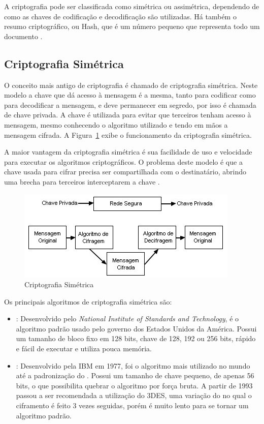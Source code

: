 A criptografia pode ser classificada como simétrica ou assimétrica, dependendo de como as chaves de codificação e decodificação são utilizadas. Há também o resumo criptográfico, ou Hash, que é um número pequeno que representa todo um documento \cite{Stallings2014}.

\subsection{Criptografia Simétrica}

O conceito mais antigo de criptografia é chamado de criptografia simétrica. Neste modelo a chave que dá acesso à mensagem é a mesma, tanto para codificar como para decodificar a mensagem, e deve permanecer em segredo, por isso é chamada de chave privada. A chave é utilizada para evitar que terceiros tenham acesso à mensagem, mesmo conhecendo o algoritmo utilizado e tendo em mãos a mensagem cifrada. A Figura~\ref{fig:cripsim} exibe o funcionamento da criptografia simétrica.

A maior vantagem da criptografia simétrica é sua facilidade de uso e velocidade para executar os algoritmos criptográficos. O problema deste modelo é que a chave usada para cifrar precisa ser compartilhada com o destinatário, abrindo uma brecha para terceiros interceptarem a chave \cite{Stallings2014}.

\begin{figure}[t]
    \centering
    \includegraphics{Images/Simetrica.jpg}
    \caption{Criptografia Simétrica}\label{fig:cripsim}
\end{figure}

Os principais algoritmos de criptografia simétrica são:
\begin{itemize}
    \item \aes: Desenvolvido pelo \textit{National Institute of Standards and Technology}, é o algoritmo padrão usado pelo governo dos Estados Unidos da América. Possui um tamanho de bloco fixo em 128 bits, chave de 128, 192 ou 256 bits, rápido e fácil de executar e utiliza pouca memória.
    \item \des: Desenvolvido pela IBM em 1977, foi o algoritmo mais utilizado no mundo até a padronização do \aes. Possui um tamanho de chave pequeno, de apenas 56 bits, o que possibilita quebrar o algoritmo por força bruta. A partir de 1993 passou a ser recomendada a utilização do 3DES, uma variação do \des no qual o ciframento é feito 3 vezes seguidas, porém é muito lento para se tornar um algoritmo padrão.
\end{itemize}

